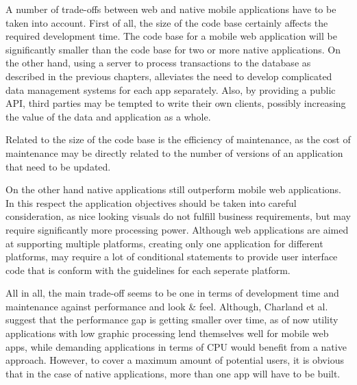 A number of trade-offs between web and native mobile applications have to be taken into account. First of all, the size of the code base certainly affects the required development time. The code base for a mobile web application will be significantly smaller than the code base for two or more native applications\cite{Charland:2011:MAD:1941487.1941504}. On the other hand, using a server to process transactions to the database as described in the previous chapters, alleviates the need to develop complicated data management systems for each app separately. Also, by providing a public API, third parties may be tempted to write their own clients, possibly increasing the value of the data and application as a whole.

Related to the size of the code base is the efficiency of maintenance, as the cost of maintenance may be directly related to the number of versions of an application that need to be updated\cite{Charland:2011:MAD:1941487.1941504}.

On the other hand native applications still outperform mobile web applications. In this respect the application objectives should be taken into careful consideration, as nice looking visuals do not fulfill business requirements, but may require significantly more processing power. Although web applications are aimed at supporting multiple platforms, creating only one application for different platforms, may require a lot of conditional statements to provide user interface code that is conform with the guidelines for each seperate platform\cite{Charland:2011:MAD:1941487.1941504}.

All in all, the main trade-off seems to be one in terms of development time and maintenance against performance and look \& feel. Although, Charland et al. suggest that the performance gap is getting smaller over time, as of now utility applications with low graphic processing lend themselves well for mobile web apps, while demanding applications in terms of CPU would benefit from a native approach. However, to cover a maximum amount of potential users, it is obvious that in the case of native applications, more than one app will have to be built.













